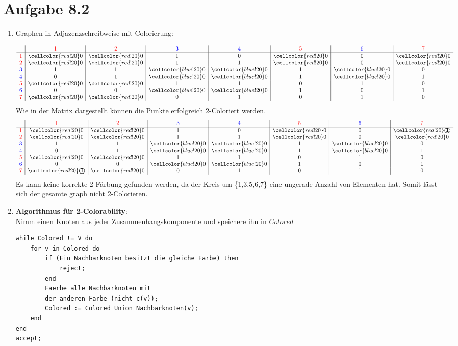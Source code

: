 \documentclass{article}
\newcommand{\rt}{\color{red}}
\newcommand{\bt}{\color{blue}}
\newcommand{\rc}{\cellcolor{red!20}}
\newcommand{\bc}{\cellcolor{blue!20}}
\begin{document}
	\section[a 8.2]{Aufgabe 8.2}
	\begin{enumerate}[label=(\alph*).]
		\item Graphen in Adjazenzschreibweise mit Colorierung:
		
		\begin{equation}
			\begin{array}{l | c | c | c | c | c | c | c}
				\ & \rt1 &  \rt2 & \bt3 & \bt4 & \rt5 & \bt6 & \rt7\\
				\hline
				\rt1& \rc0 & \rc0 & 1 & 0 & \rc0 & 0 & \rc0\\
				\rt2& \rc0 & \rc0 & 1 & 1 & \rc0 & 0 & \rc0\\
				\bt3& 1 & 1 & \bc0 & \bc0 & 1 & \bc0 & 0\\
				\bt4& 0 & 1 & \bc0 & \bc0 & 1 & \bc0 & 1\\
				\rt5& \rc0 & \rc0 & 1 & 1 & 0 & 1 & 0\\
				\bt6& 0 & 0 & \bc0 & \bc0 & 1 & 0 & 1\\
				\rt7& \rc0 & \rc0 & 0 & 1 & 0 & 1 & 0\\
			\end{array}
		\end{equation}
		Wie in der Matrix dargestellt können die Punkte erfolgreich 2-Coloriert werden.
		\begin{equation}
			\begin{array}{l | c | c | c | c | c | c | c}
				 & \rt1 &  \rt2 & \bt3 & \bt4 & \rt5 & \bt6 & \rt7\\
				\hline
				\rt1& \rc0 & \rc0 & 1 & 0 & \rc0 & 0 & \rc\textbf{\textcircled{1}}\\
				\rt2& \rc0 & \rc0 & 1 & 1 & \rc0 & 0 & \rc0\\
				\bt3& 1 & 1 & \bc0 & \bc0 & 1 & \bc0 & 0\\
				\bt4& 0 & 1 & \bc0 & \bc0 & 1 & \bc0 & 1\\
				\rt5& \rc0 & \rc0 & 1 & 1 & 0 & 1 & 0\\
				\bt6& 0 & 0 & \bc0 & \bc0 & 1 & 0 & 1\\
				\rt7& \rc\textbf{\textcircled{1}} & \rc0 & 0 & 1 & 0 & 1 & 0\\
			\end{array}
		\end{equation}
		Es kann keine korrekte 2-Färbung gefunden werden, da der Kreis um \{1,3,5,6,7\} eine ungerade Anzahl von Elementen hat. Somit lässt sich der gesamte graph nicht 2-Colorieren.
		\pagebreak
		\item \textbf{Algorithmus für 2-Colorability}:\\
		Nimm einen Knoten aus jeder Zusammenhangskomponente und speichere ihn in $Colored$\\
		\begin{lstlisting}
while Colored != V do
	for v in Colored do
		if (Ein Nachbarknoten besitzt die gleiche Farbe) then
			reject; 
		end
		Faerbe alle Nachbarknoten mit 
		der anderen Farbe (nicht c(v));
		Colored := Colored Union Nachbarknoten(v);  
	end	
end		
accept;		
		\end{lstlisting}
		

\end{enumerate}
\end{document}
